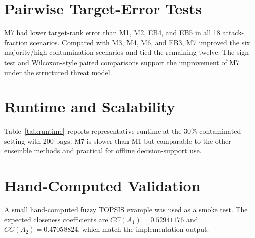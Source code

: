 

\section{Pairwise Target-Error Tests}
M7 had lower target-rank error than M1, M2, EB4, and EB5 in all 18 attack-fraction scenarios. Compared with M3, M4, M6, and EB3, M7 improved the six majority/high-contamination scenarios and tied the remaining twelve. The sign-test and Wilcoxon-style paired comparisons support the improvement of M7 under the structured threat model.



\section{Runtime and Scalability}
Table~\ref{tab:runtime} reports representative runtime at the 30\% contaminated setting with 200 bags. M7 is slower than M1 but comparable to the other ensemble methods and practical for offline decision-support use.



\section{Hand-Computed Validation}
A small hand-computed fuzzy TOPSIS example was used as a smoke test. The expected closeness coefficients are \(CC(A_1)=0.52941176\) and \(CC(A_2)=0.47058824\), which match the implementation output.
